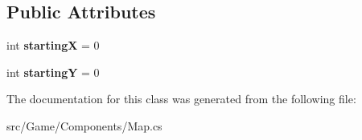\subsection*{Public Attributes}
\begin{DoxyCompactItemize}
\item 
\mbox{\label{class_game_1_1_components_1_1_map_a296f59890d41bd1f17d5acd56bcb834d}} 
int {\bfseries startingX} = 0
\item 
\mbox{\label{class_game_1_1_components_1_1_map_ace517f9735e18d693259f6dc5ff465b0}} 
int {\bfseries startingY} = 0
\end{DoxyCompactItemize}


The documentation for this class was generated from the following file\+:\begin{DoxyCompactItemize}
\item 
src/\+Game/\+Components/Map.\+cs\end{DoxyCompactItemize}

